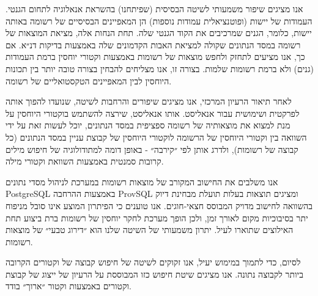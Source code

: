 {אנו מציגים שיפור משמעותי לשיטה הבסיסית (שפיתחנו) בהשראת אנאלוגיה לתחום הגנטי.
העמודות של יישות (ופוטנציאלית עמודות נוספות) הן המאפיינים הבסיסיים של רשומה באותה יישות, כלומר, הגנים שמרכיבים את הקוד הגנטי שלה.
תחת הנחות אלה, מציאת המוצאות של רשומה במסד הנתונים שקולה למציאת האבות הקדמונים שלה באמצעות בדיקות דנ״א.
אם כך, אנו מציעים לתחזק ולחפש מוצאות של רשומות באמצעות וקטורי יוחסין ברמת העמודות (גנים) ולא ברמת רשומות שלמות. בצורה זו, אנו מצליחים להבחין בצורה טובה יותר בין תכונות היוחסין לבין המאפיינים הטקסטואליים של רשומה.

לאחר תיאור הרעיון המרכזי, אנו מציגים שיפורים והרחבות לשיטה, שנועדו להפוך אותה לפרקטית ושימושית עבור אנאליסט. אותו אנאליסט, שירצה להשתמש בוקטורי היוחסין על מנת למצוא את מוצאותיה של רשומה ספציפית במסד הנתונים, יוכל לעשות זאת על ידי השוואה בין וקטורי היוחסין של הרשומה לוקטורי היוחסין של קבוצת עניין במסד הנתונים (כל קבוצה של רשומות), ולדרג אותן לפי ״קירבה״ - באופן דומה למתודולוגיה של חיפוש מילים קרובות סמנטית באמצעות השוואת וקטורי מילה.

אנו משלבים את החישוב המקורב של מוצאות רשומות במערכת לניהול מסדי נתונים
\textenglish{PostgreSQL}
באמצעות ההרחבה
\textenglish{ProvSQL}
ומציגים תוצאות בעלות תועלת מבחינת דיוק בהשוואה לחישוב מדויק המבוסס חצאי-חוגים.
אנו טוענים כי הפיתרון המוצע אינו סובל מניפוח יתר בסיבוכיות מקום לאורך זמן,
ולכן הופך מערכת לחקר יוחסין של רשומות ברת ביצוע תחת האילוצים שתוארו לעיל.
יתרון משמעותי של השיטה שלנו הוא ״דירוג טבעי״ של מוצאות רשומות.

לסיום, כדי לתמוך במימוש יעיל, אנו זקוקים לשיטה של חיפוש קבוצה של וקטורים הקרובה ביותר לקבוצה נתונה. 
אנו מציגים שיטת חיפוש כזו המבוססת על הרעיון של ייצוג של קבוצת וקטורים באמצעות וקטור ״ארוך״ בודד.





}
